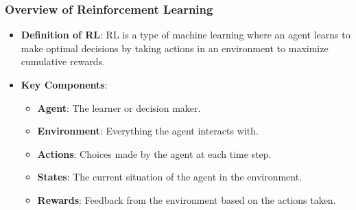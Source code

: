 \documentclass[aspectratio=169]{beamer}
\begin{document}
\begin{frame}[fragile]
    \frametitle{Overview of Reinforcement Learning}
    \begin{itemize}
        \item \textbf{Definition of RL}: RL is a type of machine learning where an agent learns to make optimal decisions by taking actions in an environment to maximize cumulative rewards.
        \item \textbf{Key Components}:
        \begin{itemize}
            \item \textbf{Agent}: The learner or decision maker.
            \item \textbf{Environment}: Everything the agent interacts with.
            \item \textbf{Actions}: Choices made by the agent at each time step.
            \item \textbf{States}: The current situation of the agent in the environment.
            \item \textbf{Rewards}: Feedback from the environment based on the actions taken.
        \end{itemize}
    \end{itemize}
\end{frame}
\end{document}
